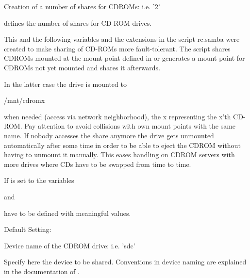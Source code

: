 \begin{description}

  Creation of a number of shares for CDROMs: i.e. '2'

   defines the number of shares for CD-ROM drives.

  This and the following variables and the extensions in
  the script rc.samba were created to make sharing of CD-ROMs
  more fault-tolerant. The script shares CDROMs
  mounted at the mount point defined in 
  or generates a mount point for CDROMs not yet mounted
  and shares it afterwards.

  In the latter case the drive is mounted to

  /mnt/cdromx

  when needed (access via network neighborhood), the x representing
  the x'th CD-ROM. Pay attention to avoid collisions with own mount
  points with the same name. If nobody accesses the share anymore the
  drive gets unmounted automatically after some time in order to be able to
  eject the CDROM without having to unmount it manually. This eases handling
  on CDROM servers with more drives where CDs have to be swapped from time to time.

  If  is set to the variables


  and


  have to be defined with meaningful values.

  Default Setting:     

\end{description}

\begin{description}

  Device name of the CDROM drive: i.e. 'sdc'

  Specify here the device to be shared. Conventions in device naming
  are explained in the documentation of .

\end{description}

